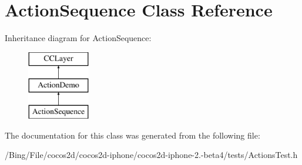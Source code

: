 \hypertarget{interface_action_sequence}{\section{Action\-Sequence Class Reference}
\label{interface_action_sequence}
}
Inheritance diagram for Action\-Sequence\-:\begin{figure}[H]
\begin{center}
\leavevmode
\includegraphics[height=3.000000cm]{interface_action_sequence}
\end{center}
\end{figure}


The documentation for this class was generated from the following file\-:\begin{DoxyCompactItemize}
\item 
/\-Bing/\-File/cocos2d/cocos2d-\/iphone/cocos2d-\/iphone-\/2.-\/beta4/tests/Actions\-Test.\-h\end{DoxyCompactItemize}

